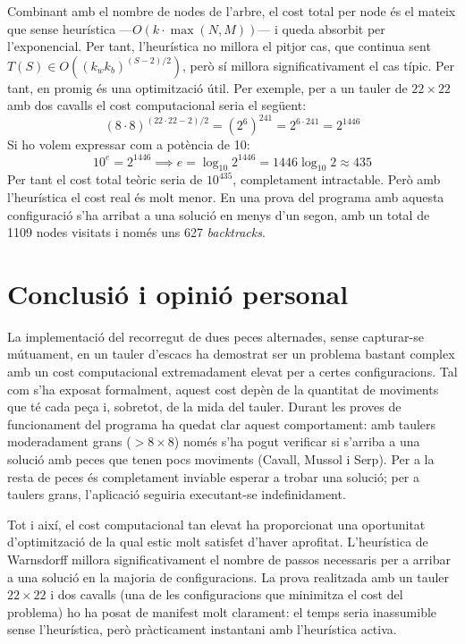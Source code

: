 \documentclass[conference,compsoc]{IEEEtran}
\begin{document}
Combinant amb el nombre de nodes de l'arbre, el cost total per node
és el mateix que sense heurística —$O(k \cdot \max(N,M))$— i queda
absorbit per l'exponencial. Per tant, l'heurística no millora el
pitjor cas, que continua sent
$T(S) \in O\!\left((k_w k_b)^{(S-2)/2}\right)$, però sí millora
significativament el cas típic. Per tant, en promig és una optimització útil.
Per exemple, per a un tauler de $22 \times 22$ amb dos cavalls el cost computacional
seria el següent:
\[
      (8 \cdot 8)^{(22 \cdot 22 - 2) / 2} = (2^{6})^{241} = 2^{6 \cdot 241} = 2^{1446}
\]
Si ho volem expressar com a potència de 10:
\[
      10^e = 2^{1446} \implies e = \log_{10} 2^{1446} = 1446 \log_{10} 2 \approx 435
\]
Per tant el cost total teòric seria de $10^{435}$, completament intractable. Però
amb l'heurística el cost real és molt menor. En una prova del programa amb aquesta
configuració s'ha arribat a una solució en menys d'un segon, amb un total de 
1109 nodes visitats i només uns 627 \textit{backtracks}.

\section{Conclusió i opinió personal}

La implementació del recorregut de dues peces alternades, sense capturar-se mútuament,
en un tauler d'escacs ha demostrat ser un problema bastant complex amb un cost computacional
extremadament elevat per a certes configuracions. Tal com s'ha exposat formalment,
aquest cost depèn de la quantitat de moviments que té cada peça i, sobretot, de la mida del tauler.
Durant les proves de funcionament del programa ha quedat clar aquest
comportament: amb taulers moderadament grans ($> 8 \times 8$) només s'ha pogut verificar si s'arriba a una
solució amb peces que tenen pocs moviments (Cavall, Mussol i Serp). Per a la resta de peces és
completament inviable esperar a trobar una solució; per a taulers grans, l'aplicació
seguiria executant-se indefinidament.

Tot i així, el cost computacional tan elevat ha proporcionat una oportunitat d'optimització
de la qual estic molt satisfet d'haver aprofitat. L'heurística de Warnsdorff millora significativament
el nombre de passos necessaris per a arribar a una solució en la majoria de configuracions.
La prova realitzada amb un tauler $22 \times 22$ i dos cavalls (una de les configuracions que
minimitza el cost del problema) ho ha posat de manifest molt clarament: el temps seria inassumible sense l'heurística,
però pràcticament instantani amb l'heurística activa.
\end{document}
